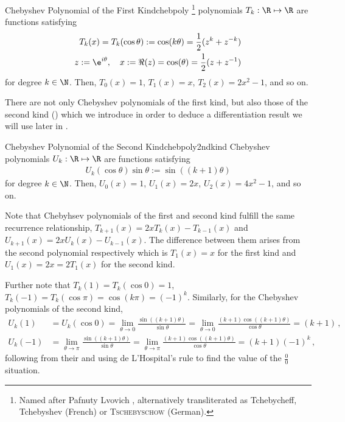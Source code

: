 \documentclass{prettytex/ox/mmsc-special-topic}
\begin{document}
  \begin{definition}{Chebyshev Polynomial of the First Kind}{chebpoly}
    \chebyshev\footnote{Named after Pafnuty Lvovich \chebyshev, alternatively transliterated as Tchebycheff, Tchebyshev (French) or \textsc{Tschebyschow} (German).} polynomials $T_k: \R \mapsto \R$ are functions satisfying
    \begin{align*}
      T_k(x) = T_k(\cos \theta) := \cos(k \theta) = \frac{1}{2} (z^k + z^{-k}) \\
      z := \e^{i \theta},\quad x := \Re(z) = \cos(\theta) = \frac{1}{2}(z + z^{-1})
    \end{align*}
    for degree $k \in \N$. Then, $T_0(x) = 1$, $T_1(x) = x$, $T_2(x) = 2x^2-1$, and so on.
  \end{definition}

  There are not only Chebyshev polynomials of the first kind, but also those of the second kind () which we introduce in order to deduce a differentiation result we will use later in .

  \begin{definition}{Chebyshev Polynomial of the Second Kind}{chebpoly2ndkind}
    Chebyshev polynomials $U_k: \R \mapsto \R$ are functions satisfying
    \begin{align*}
      U_k(\cos \theta) \sin \theta := \sin\left((k+1) \theta\right)
    \end{align*}
    for degree $k \in \N$. Then, $U_0(x) = 1$, $U_1(x) = 2x$, $U_2(x) = 4x^2-1$, and so on.
  \end{definition}
  Note that Chebyhsev polynomials of the first and second kind fulfill the same recurrence relationship, $T_{k+1}(x) = 2x T_k(x) - T_{k-1}(x)$ and $U_{k+1}(x) = 2x U_k(x) - U_{k-1}(x)$. The difference between them arises from the second polynomial respectively which is $T_1(x)=x$ for the first kind and $U_1(x) = 2x = 2 T_1(x)$ for the second kind.

  Further note that $T_k(1) = T_k(\cos 0) = 1$, $T_k(-1) = T_k(\cos \pi) = \cos(k \pi) = (-1)^k$.
  Similarly, for the Chebyshev polynomials of the second kind,
  \begin{align}
    \label{eq:cheb2ndkind-critical-value-1} U_k(1)   & = U_k(\cos 0) = \lim_{\theta \rightarrow 0} \frac{\sin\left((k+1) \theta\right)}{\sin \theta} = \lim_{\theta \rightarrow 0} \frac{(k+1)\cos\left((k+1) \theta\right)}{\cos \theta} = (k+1)\,, \\
    \label{eq:cheb2ndkind-critical-value--1} U_k(-1) & = \lim_{\theta \rightarrow \pi} \frac{\sin\left((k+1) \theta\right)}{\sin \theta} = \lim_{\theta \rightarrow \pi} \frac{(k+1)\cos\left((k+1) \theta\right)}{\cos \theta} = (k+1) (-1)^k\,,
  \end{align}
  following from their  and using de L'Hospital's rule to find the value of the $\frac{0}{0}$ situation.
\end{document}
